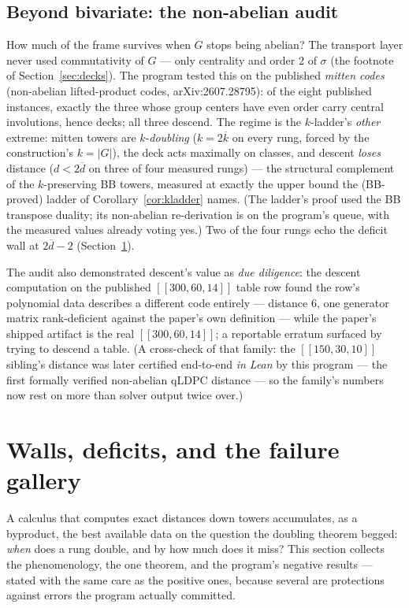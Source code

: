 \documentclass[11pt]{article}
\theoremstyle{plain}
\theoremstyle{definition}
\theoremstyle{remark}
\newcommand{\ov}[1]{\overline{#1}}
\begin{document}
\subsection{Beyond bivariate: the non-abelian audit}

How much of the frame survives when $G$ stops being abelian? The
transport layer never used commutativity of $G$ --- only centrality and
order 2 of $\sigma$ (the footnote of Section~\ref{sec:decks}). The
program tested this on the published \emph{mitten codes}
(non-abelian lifted-product codes, arXiv:2607.28795): of the eight
published instances, exactly the three whose group centers have even
order carry central involutions, hence decks; all three descend. The
regime is the $k$-ladder's \emph{other} extreme: mitten towers are
$k$-\emph{doubling} ($k = 2\ov k$ on every rung, forced by the
construction's $k = \lvert G\rvert$), the deck acts maximally on
classes, and descent \emph{loses} distance ($d < 2\ov d$ on three of
four measured rungs) --- the structural complement of the $k$-preserving
BB towers, measured at exactly the upper bound the (BB-proved) ladder of
Corollary~\ref{cor:kladder} names. (The ladder's proof used the BB
transpose duality; its non-abelian re-derivation is on the program's
queue, with the measured values already voting yes.) Two of the
four rungs echo the deficit wall at $2\ov d - 2$
(Section~\ref{sec:walls}).

The audit also demonstrated descent's value as \emph{due diligence}: the
descent computation on the published $[[300,60,14]]$ table row found the
row's polynomial data describes a different code entirely --- distance
6, one generator matrix rank-deficient against the paper's own
definition --- while the paper's shipped artifact is the real
$[[300,60,14]]$; a reportable erratum surfaced by trying to descend a
table. (A cross-check of that family: the $[[150,30,10]]$ sibling's
distance was later certified end-to-end \emph{in Lean} by this program
--- the first formally verified non-abelian qLDPC distance --- so the
family's numbers now rest on more than solver output twice over.)

\section{Walls, deficits, and the failure gallery}
\label{sec:walls}

A calculus that computes exact distances down towers accumulates, as a
byproduct, the best available data on the question the doubling theorem
begged: \emph{when} does a rung double, and by how much does it miss?
This section collects the phenomenology, the one theorem, and the
program's negative results --- stated with the same care as the positive
ones, because several are protections against errors the program
actually committed.
\end{document}
